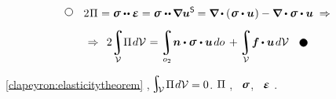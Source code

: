 \vspace{-0.55em}\begin{multline*}
\tikz[baseline=-1ex] \draw [line width=.5pt, color=black, fill=white] (0, 0) circle (.8ex);
\hspace{2.25ex}
2 \hspace{.1ex} \potential \hspace{.1ex} = \linearstress \dotdotp \infinitesimaldeformation =
\linearstress \hspace{.1ex} \dotdotp \hspace{-0.12ex} \boldnabla \bm{u}^{\mathsf{S}} \hspace{-0.12ex} =
\boldnabla \hspace{-0.1ex} \dotp \left( \hspace{.1ex} \linearstress \dotp \bm{u} \hspace{.1ex} \right) -
\tikzmark{beginMinusLoad} \boldnabla \dotp \linearstress \tikzmark{endMinusLoad} \dotp \bm{u} \;\Rightarrow
\\[.5em]
%
\Rightarrow\;\,
\displaystyle 2 \hspace{-0.16em}
\integral\displaylimits_{\mathcal{V}} \hspace{-0.5ex}
  \potential \hspace{.2ex} d\mathcal{V} \hspace{.12ex}
= \integral\displaylimits_{o_2} \hspace{-0.4ex}
\tikzmark{beginSurfaceLoad}
  \unitnormalvector \dotp \linearstress
\tikzmark{endSurfaceLoad} \hspace{.1ex}
  \dotp \bm{u} \hspace{.25ex} do \hspace{.4ex}
+ \integral\displaylimits_{\mathcal{V}} \hspace{-0.4ex}
  \bm{f} \hspace{-0.1ex} \dotp \bm{u} \hspace{.25ex}
  d\mathcal{V} \hspace{2.25ex}
\tikz[baseline=-0.6ex] \draw [color=black, fill=black] (0, 0) circle (.8ex);
\end{multline*}%
%

\vspace{-0.2em}
~\eqref{clapeyron:elasticitytheorem}
,
${\hspace{-0.25ex}
\scalebox{1.4}{$ \integral $}_
{ \hspace{-0.5ex}
   \raisemath{.1em}{\mathcal{V}}
} \hspace{.25ex}
\potential \hspace{.2ex} d\mathcal{V}
= 0
}$.
 $\Pi$
,
~$\linearstress$,
~$\infinitesimaldeformation$
.

